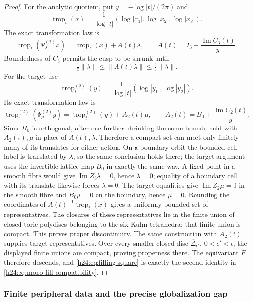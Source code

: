 \begin{proof}
For the analytic quotient, put
$y=-\log|t|/(2\pi)$ and
\[
 \operatorname{trop}_t(x)=\frac{1}{\log|t|}
       (\log|x_1|,\log|x_2|,\log|x_3|).
\]
The exact transformation law is
\[
 \operatorname{trop}_t(\Psi^{(3)}_\lambda x)
 =\operatorname{trop}_t(x)+A(t)\lambda,\qquad
 A(t)=I_3+\frac{\operatorname{Im}C_3(t)}{y}.
\]
Boundedness of $C_3$ permits the cusp to be shrunk until
\[
\tfrac12\|\lambda\|\le\|A(t)\lambda\|
 \le\tfrac32\|\lambda\|.
\]
For the target use
\[
 \operatorname{trop}^{(2)}_t(y)
 =\frac{1}{\log|t|}(\log|y_1|,\log|y_2|).
\]
Its exact transformation law is
\[
 \operatorname{trop}^{(2)}_t(\Psi^{(2)}_\mu y)
 =\operatorname{trop}^{(2)}_t(y)+A_2(t)\mu,
 \qquad A_2(t)=B_0+\frac{\operatorname{Im}C_2(t)}{y}.
\]
Since $B_0$ is orthogonal, after one further shrinking the same bounds hold
with $A_2(t),\mu$ in place of $A(t),\lambda$.  Therefore a compact set can
meet only finitely many of its translates for either action.
On a boundary orbit the bounded cell label is translated by $\lambda$, so
the same conclusion holds there; the target argument uses the invertible
lattice map $B_0$ in exactly the same way.  A fixed point in a smooth fibre would
give $\operatorname{Im}Z_3\lambda=0$, hence $\lambda=0$; equality of a
boundary cell with its translate likewise forces $\lambda=0$.  The target
equalities give $\operatorname{Im}Z_2\mu=0$ in the smooth fibre and
$B_0\mu=0$ on the boundary, hence $\mu=0$.  Rounding
the coordinates of $A(t)^{-1}\operatorname{trop}_t(x)$ gives a uniformly
 bounded set of representatives.  The closures of these representatives lie
 in the finite union of closed toric polydiscs belonging to the six Kuhn
 tetrahedra; that finite union is compact.  This proves proper
discontinuity.  The same construction with $A_2(t)$ supplies target
representatives.  Over every smaller closed disc
$\overline\Delta_{\epsilon'}$, $0<\epsilon'<\epsilon$, the displayed
finite unions are compact, proving properness there.  The equivariant $F$
therefore descends, and
\eqref{h24:eq:filling-square} is exactly the second identity in
\eqref{h24:eq:mono-fill-compatibility}.
\end{proof}

\subsubsection{Finite peripheral data and the precise globalization gap}

